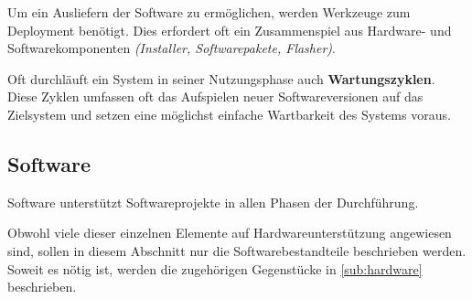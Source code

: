 Um ein Ausliefern der Software zu ermöglichen, werden Werkzeuge zum Deployment
benötigt. Dies erfordert oft ein Zusammenspiel aus Hardware-
und Softwarekomponenten \emph{(Installer, Softwarepakete, Flasher)}.

Oft durchläuft ein System in seiner Nutzungsphase auch \textbf{Wartungszyklen}.
Diese Zyklen umfassen oft das Aufspielen neuer Softwareversionen auf das
Zielsystem und setzen eine möglichst einfache Wartbarkeit des Systems
voraus.

\subsection{Software}\label{sub:software}
Software unterstützt Softwareprojekte in allen Phasen der Durchführung.

Obwohl viele dieser einzelnen Elemente auf Hardwareunterstützung angewiesen
sind, sollen in diesem Abschnitt nur die Softwarebestandteile beschrieben
werden. Soweit es nötig ist, werden die zugehörigen Gegenstücke in
\autoref{sub:hardware} beschrieben.


